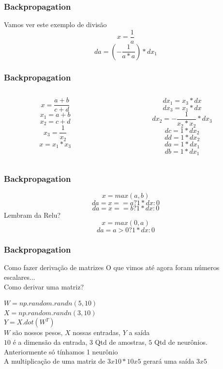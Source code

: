 \documentclass{beamer}
\begin{document}
\begin{frame}
	\frametitle{Backpropagation}
		\begin{example}
			Vamos ver este exemplo de divisão
			$$x = \frac{1}{a}$$
			$$da = (-\frac{1}{a*a})*dx_1$$
		\end{example}
\end{frame}
\begin{frame}
	\frametitle{Backpropagation}
	\begin{example}
	\begin{columns}
		\begin{column}{0.35\textwidth}
			
				$$x = \frac{a+ b}{c +d}$$
				$$x_1 = a + b$$
				$$x_2 = c + d$$
				$$x_3 = \frac{1}{x_2} $$
				$$x = x_1 * x_3$$
		\end{column}
		\begin{column}{0.35\textwidth}
			$$dx_1 = x_3 * dx$$
			$$dx_3 = x_1 * dx$$
			$$dx_2 = - \frac{1}{x_2 * x_2}*dx_3$$
			$$dc = 1 * dx_2$$
			$$dd = 1 * dx_2$$
			$$da = 1 * dx_1$$
			$$db = 1 * dx_1$$
		\end{column}
	\end{columns}
\end{example}
\end{frame}
\begin{frame}
	\frametitle{Backpropagation}
	\begin{example}
		$$x = max(a, b)$$
		$$da = x == a ? 1 * dx : 0$$
		$$da = x == b ? 1 * dx : 0$$
		Lembram da Relu?
		$$x = max(0, a)$$
		$$da = a> 0 ? 1 * dx : 0$$
	\end{example}
\end{frame}
\begin{frame}
	\frametitle{Backpropagation}
	\begin{block}{Como fazer derivação de matrizes}
		O que vimos até agora foram números escalares... \\
		Como derivar uma matriz?
	\end{block}
	\begin{example}	
		
		$W = np.random.randn(5, 10)$ \\
		$X = np.random.randn(3, 10)$ \\
		$Y = X.dot(W^T)$ \\
		$W$ são nossos pesos, $X$ nossas entradas, $Y$ a saída \\
		$10$ é a dimensão da entrada, $3$ Qtd de amostras, $5$ Qtd de neurônios. \\
		Anteriormente só tínhamos 1 neurônio \\ 
		A multiplicação de uma matriz de $3x10 * 10x5$ gerará uma saída $3x5$
	\end{example}
\end{frame}
\end{document}

